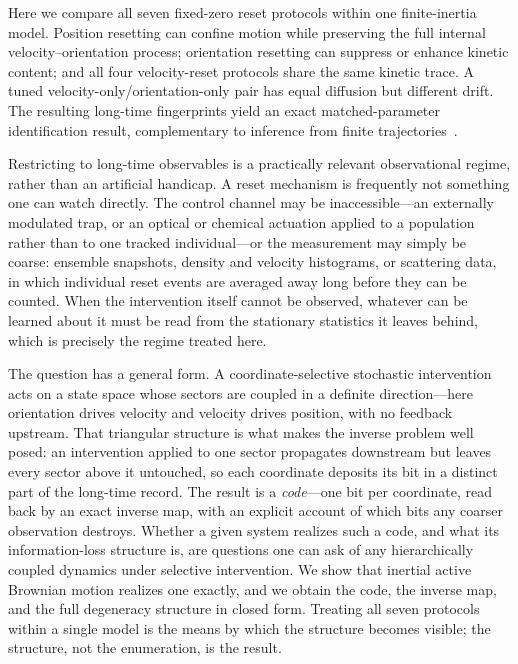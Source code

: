 Here we compare all seven fixed-zero reset protocols within one finite-inertia model. Position resetting can confine motion while preserving the full internal velocity--orientation process; orientation resetting can suppress or enhance kinetic content; and all four velocity-reset protocols share the same kinetic trace. A tuned velocity-only/orientation-only pair has equal diffusion but different drift. The resulting long-time fingerprints yield an exact matched-parameter identification result, complementary to inference from finite trajectories~\cite{FrishmanRonceray2020}.

Restricting to long-time observables is a practically relevant observational regime, rather than an artificial handicap. A reset mechanism is frequently not something one can watch directly. The control channel may be inaccessible---an externally modulated trap, or an optical or chemical actuation applied to a population rather than to one tracked individual---or the measurement may simply be coarse: ensemble snapshots, density and velocity histograms, or scattering data, in which individual reset events are averaged away long before they can be counted. When the intervention itself cannot be observed, whatever can be learned about it must be read from the stationary statistics it leaves behind, which is precisely the regime treated here.

The question has a general form. A coordinate-selective stochastic intervention acts on a state space whose sectors are coupled in a definite direction---here orientation drives velocity and velocity drives position, with no feedback upstream. That triangular structure is what makes the inverse problem well posed: an intervention applied to one sector propagates downstream but leaves every sector above it untouched, so each coordinate deposits its bit in a distinct part of the long-time record. The result is a \emph{code}---one bit per coordinate, read back by an exact inverse map, with an explicit account of which bits any coarser observation destroys. Whether a given system realizes such a code, and what its information-loss structure is, are questions one can ask of any hierarchically coupled dynamics under selective intervention. We show that inertial active Brownian motion realizes one exactly, and we obtain the code, the inverse map, and the full degeneracy structure in closed form. Treating all seven protocols within a single model is the means by which the structure becomes visible; the structure, not the enumeration, is the result.


